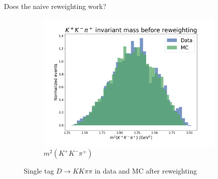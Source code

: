 \documentclass{beamer}
\begin{document}
\begin{frame}{Does the naive reweighting work?}
\begin{figure}
\begin{subfigure}{0.33\textwidth}
      \includegraphics[width = 1.0\textwidth]{Plots/s012_DataMCMismatch_BeforeReweighting.png}
      \caption{$m^2(K^+K^-\pi^+)$}
    \end{subfigure}
    \caption{Single tag $D\to KK\pi\pi$ in data and MC after reweighting}
  \end{figure}
\end{frame}
\end{document}
